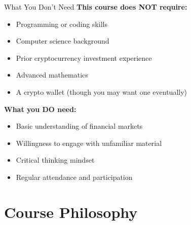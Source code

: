 \documentclass[10pt]{beamer}
\begin{document}
\begin{frame}{What You Don't Need}
  \textbf{This course does NOT require:}
  
  \vspace{1em}
  \begin{itemize}
    \item Programming or coding skills
    \item Computer science background
    \item Prior cryptocurrency investment experience
    \item Advanced mathematics
    \item A crypto wallet (though you may want one eventually)
  \end{itemize}
  
  \vspace{1em}
  \textbf{What you DO need:}
  \begin{itemize}
    \item Basic understanding of financial markets
    \item Willingness to engage with unfamiliar material
    \item Critical thinking mindset
    \item Regular attendance and participation
  \end{itemize}
\end{frame}

\section{Course Philosophy}
\end{document}

